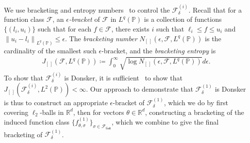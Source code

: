\documentclass[11pt]{article}
\newcommand{\Prb}{\mathbb{P}}
\newcommand{\R}{\mathbb{R}} %
\renewcommand{\P}{\mathbb{P}}
\newcommand{\mc}[1]{\mathcal{#1}}
\newcommand{\norm}[1]{\left\|{#1}\right\|} %
\newcommand{\Flink}{\mathcal{F}_{\mathsf{link}}}
\newcommand{\<}{\langle} %
\renewcommand{\>}{\rangle}
\newcommand{\defeq}{\coloneqq}
\begin{document}
We use bracketing and entropy numbers~\cite{VanDerVaartWe96} to control the
$\mc{F}_\delta^{(i)}$. Recall that for a function class $\mc{F}$, an
\emph{$\epsilon$-bracket} of $\mc{F}$ in $L^q(\P)$ is a collection of
functions $\{(l_i, u_i)\}$ such that for each $f \in \mc{F}$, there exists
$i$ such that $\ell_i \le f \le u_i$ and $\norm{u_i - l_i}_{L^q(\P)} \le
\epsilon$. The \emph{bracketing number} $N_{[\,]}(\epsilon, \mc{F}, L^q(\P))$
is the cardinality of the smallest such $\epsilon$-bracket, and
the \emph{bracketing entropy} is
\begin{align*}
	J_{[\,]}(\mc{F}, L^q(\P))
	\defeq \int_0^\infty
	\sqrt{\log N_{[\,]}(\epsilon , \mathcal{F}, L^q(\Prb))} d \epsilon.
\end{align*}
To show that $\mc{F}_\delta^{(i)}$ is Donsker, it is
sufficient~\cite[Ch.~2.5.2]{VanDerVaartWe96} to show that
$J_{[\,]}(\mc{F}_\delta^{(i)}, L^2(\P)) < \infty$.
%
Our approach to demonstrate that $\mc{F}_\delta^{(1)}$ is Donsker is thus to
construct an appropriate $\epsilon$-bracket of $\mc{F}_\delta^{(1)}$, which
we do
by first covering $\ell_2$-balls in $\R^d$, then for vectors
$\theta \in \R^d$, constructing a bracketing of the induced function class
$\{f_{\theta,\sigma}^{(1)}\}_{\sigma \in \Flink}$, which we combine
to give the final bracketing of $\mc{F}_\delta^{(1)}$.
\end{document}
